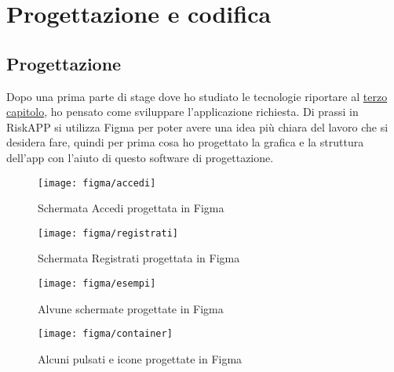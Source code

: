\chapter{Progettazione e codifica}
\label{cap:progettazione-codifica}




\section{Progettazione}
\label{sec:progettazione}

Dopo una prima parte di stage dove ho studiato le tecnologie riportare al \hyperref[sec:tecnologie]{terzo capitolo}, ho pensato come sviluppare l'applicazione richiesta.\newline
Di prassi in RiskAPP si utilizza Figma per poter avere una idea più chiara del lavoro che si desidera fare, quindi per prima cosa ho progettato la grafica e la struttura dell'app con l'aiuto di questo software di progettazione.\newline

\begin{figure}[!h] 
    \centering 
    \texttt{[image: figma/accedi]} 
    \caption{Schermata Accedi progettata in Figma}
\end{figure}

\begin{figure}[!h] 
    \centering 
    \texttt{[image: figma/registrati]} 
    \caption{Schermata Registrati progettata in Figma}
\end{figure}

\begin{figure}[!h] 
    \centering 
    \texttt{[image: figma/esempi]} 
    \caption{Alvune schermate progettate in Figma}
\end{figure}

\begin{figure}[!h] 
    \centering 
    \texttt{[image: figma/container]} 
    \caption{Alcuni pulsati e icone progettate in Figma}
\end{figure}

%


